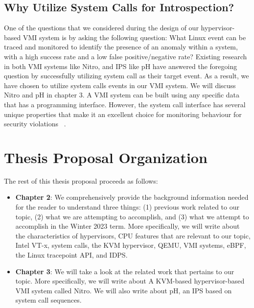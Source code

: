 \documentclass{report}
\begin{document}
\begin{spacing}{1.5}
\subsection{Why Utilize System Calls for Introspection?}

{\large
One of the questions that we considered during the design of our hypervisor-based VMI system is by asking the following question: What Linux event can be traced and monitored to identify the presence of an anomaly within a system, with a high success rate and a low false positive/negative rate? Existing research in both VMI systems like Nitro, and IPS like pH have answered the foregoing question by successfully utilizing system call as their target event. As a result, we have chosen to utilize system calls events in our VMI system. We will discuss Nitro and pH in chapter 3. A VMI system can be built using any specific data that has a programming interface. However, the system call interface has several unique properties that make it an excellent choice for monitoring behaviour for security violations ~\cite{somayaji2002operating}.
\newline
}


















\section{Thesis Proposal Organization}
{\large
The rest of this thesis proposal proceeds as follows:

\begin{itemize}
    \item \textbf{Chapter 2}: We comprehensively provide the background information needed for the reader to understand three things: (1) previous work related to our topic, (2) what we are attempting to accomplish, and (3) what we attempt to accomplish in the Winter 2023 term. More specifically, we will write about the characteristics of hypervisors, CPU features that are relevant to our topic, Intel VT-x, system calls, the KVM hypervisor, QEMU, VMI systems, eBPF, the Linux tracepoint API, and IDPS.

    \item \textbf{Chapter 3}: We will take a look at the related work that pertains to our topic. More specifically, we will write about A KVM-based hypervisor-based VMI system called Nitro. We will also write about pH, an IPS based on system call sequences.


\end{itemize}}
\end{spacing}
\end{document}
